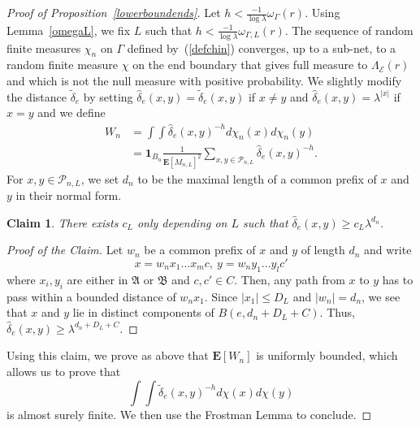 \documentclass{amsart}
\newtheorem*{claim}{Claim}
\theoremstyle{definition}
\theoremstyle{remark}
\begin{document}
\begin{proof}[Proof of Proposition~\ref{lowerboundends}]
Let $h<\frac{-1}{\log \lambda}\omega_\Gamma(r)$.
Using Lemma~\ref{omegaL}, we fix $L$ such that $h<\frac{-1}{\log \lambda}\omega_{\Gamma,L}(r)$.
The sequence of random finite measures $\chi_n$ on $\Gamma$ defined by~(\ref{defchin}) converges, up to a sub-net, to a random finite measure $\chi$ on the end boundary that gives full measure to $\Lambda_{\mathcal{E}}(r)$ and which is not the null measure with positive probability.
We slightly modify the distance $\tilde{\delta}_e$ by setting $\hat{\delta}_e(x,y)=\tilde{\delta}_e(x,y)$ if $x\neq y$ and $\hat{\delta}_e(x,y)=\lambda^{|x|}$ if $x=y$ and we define
\begin{align*}
  W_n &= \int\int \hat{\delta}_e(x, y)^{-h} d \chi_n(x) d \chi_n(y)\\
  &= \mathbf 1_{B_n}\frac{1}{\mathbf{E} \left[ M_{n, L} \right]^2} \sum_{x, y \in \mathcal{P}_{n, L}} \hat{\delta}_e(x, y)^{-h}. 
\end{align*}
For $x,y\in \mathcal{P}_{n,L}$, we set $d_n$ to be the maximal length of a common prefix of $x$ and $y$ in their normal form.
\begin{claim}
There exists $c_L$ only depending on $L$ such that $\hat{\delta}_e(x,y)\geq c_L\lambda^{d_n}$.
\end{claim}
\begin{proof}[Proof of the Claim]
Let $w_n$ be a common prefix of $x$ and $y$ of length $d_n$ and write
$$x=w_nx_1...x_mc,\ y=w_ny_1...y_lc'$$
where $x_i,y_i$ are either in $\mathfrak{A}$ or $\mathfrak{B}$ and $c,c'\in C$.
Then, any path from $x$ to $y$ has to pass within a bounded distance of $w_nx_1$.
Since $|x_1|\leq D_L$ and $|w_n|=d_n$, we see that $x$ and $y$ lie in distinct components of $B(e,d_n+D_L+C)$.
Thus, $\hat{\delta}_e(x,y)\geq \lambda^{d_n+D_L+C}$.
\end{proof}
Using this claim, we prove as above that $\mathbf E[W_n]$ is uniformly bounded, which allows us to prove that
$$\int \int \tilde{\delta}_e(x,y)^{-h}d\chi(x)d\chi(y)$$
is almost surely finite.
We then use the Frostman Lemma to conclude.
\end{proof}
\end{document}
